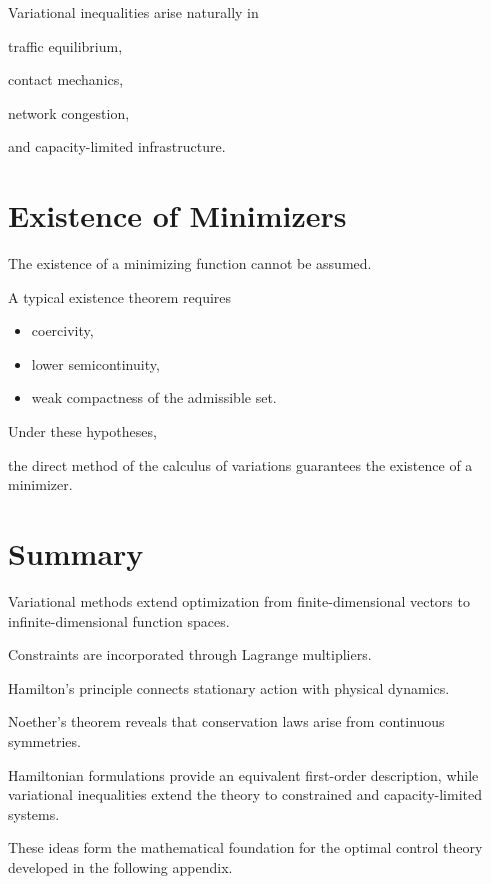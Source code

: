 \documentclass[11pt,fleqn]{book}
\numberwithin{equation}{chapter}
\theoremstyle{plain}
\theoremstyle{definition}
\theoremstyle{remark}
\begin{document}
Variational inequalities arise naturally in

traffic equilibrium,

contact mechanics,

network congestion,

and capacity-limited infrastructure.


\section{Existence of Minimizers}

The existence of a minimizing function cannot be assumed.

A typical existence theorem requires

\begin{itemize}
\item coercivity,
\item lower semicontinuity,
\item weak compactness of the admissible set.
\end{itemize}

Under these hypotheses,

the direct method of the calculus of variations guarantees the existence
of a minimizer.


\section{Summary}

Variational methods extend optimization from finite-dimensional vectors
to infinite-dimensional function spaces.

Constraints are incorporated through Lagrange multipliers.

Hamilton's principle connects stationary action with physical dynamics.

Noether's theorem reveals that conservation laws arise from continuous
symmetries.

Hamiltonian formulations provide an equivalent first-order description,
while variational inequalities extend the theory to constrained and
capacity-limited systems.

These ideas form the mathematical foundation for the optimal control
theory developed in the following appendix.

\end{document}
